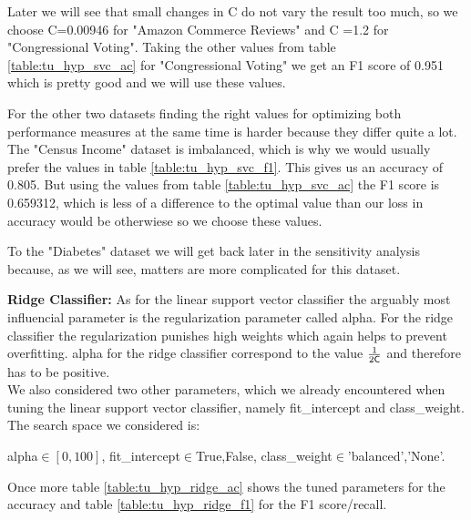 \documentclass[a4paper,10pt]{article}
\begin{document}
Later we will see that small changes in \textsf{C} do not vary the result too much, so we choose \textsf{C}=0.00946 for "Amazon Commerce Reviews" and \textsf{C} =1.2 for "Congressional Voting". Taking the other values from table \ref{table:tu_hyp_svc_ac} for "Congressional Voting" we get an F1 score of 0.951 which is pretty good and we will use these values.

For the other two datasets finding the right values for optimizing both performance measures at the same time is harder because they differ quite a lot. The "Census Income" dataset is imbalanced, which is why we would usually prefer the values in table \ref{table:tu_hyp_svc_f1}. This gives us an accuracy of 0.805. But using the values from table \ref{table:tu_hyp_svc_ac} the F1 score is 0.659312, which is less of a difference to the optimal value than our loss in accuracy would be otherwiese so we choose these values.

To the "Diabetes" dataset we will get back later in the sensitivity analysis because, as we will see, matters are more complicated for this dataset.

\textbf{Ridge Classifier:}
As for the linear support vector classifier the arguably most influencial parameter is the regularization parameter called \textsf{alpha}. For the ridge classifier the regularization punishes high weights which again helps to prevent overfitting. \textsf{alpha} for the ridge classifier correspond to the value \(\frac{1}{2 \text{\textsf{C}}}\) and therefore has to be positive.\\
We also considered two other parameters, which we already encountered when tuning the linear support vector classifier, namely \textsf{fit\_intercept} and \textsf{class\_weight}. The search space we considered is:
\begin{center}
    \textsf{alpha}\(\in[0,100]\), \textsf{fit\_intercept}\(\in\){True,False}, \textsf{class\_weight}\(\in\){'balanced','None'}.
\end{center}

Once more table \ref{table:tu_hyp_ridge_ac} shows the tuned parameters for the accuracy and table \ref{table:tu_hyp_ridge_f1} for the F1 score/recall.
\end{document}
